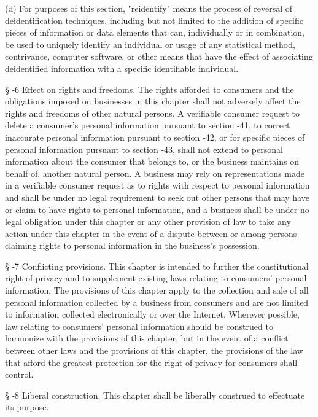      (d)  For purposes of this section, "reidentify" means the process of reversal of deidentification techniques, including but not limited to the addition of specific pieces of information or data elements that can, individually or in combination, be used to uniquely identify an individual or usage of any statistical method, contrivance, computer software, or other means that have the effect of associating deidentified information with a specific identifiable individual.

     §   -6  Effect on rights and freedoms.  The rights afforded to consumers and the obligations imposed on businesses in this chapter shall not adversely affect the rights and freedoms of other natural persons.  A verifiable consumer request to delete a consumer's personal information pursuant to section    -41, to correct inaccurate personal information pursuant to section    ‑42, or for specific pieces of personal information pursuant to section    ‑43, shall not extend to personal information about the consumer that belongs to, or the business maintains on behalf of, another natural person.  A business may rely on representations made in a verifiable consumer request as to rights with respect to personal information and shall be under no legal requirement to seek out other persons that may have or claim to have rights to personal information, and a business shall be under no legal obligation under this chapter or any other provision of law to take any action under this chapter in the event of a dispute between or among persons claiming rights to personal information in the business's possession.

     §   -7  Conflicting provisions.  This chapter is intended to further the constitutional right of privacy and to supplement existing laws relating to consumers' personal information.  The provisions of this chapter apply to the collection and sale of all personal information collected by a business from consumers and are not limited to information collected electronically or over the Internet.  Wherever possible, law relating to consumers' personal information should be construed to harmonize with the provisions of this chapter, but in the event of a conflict between other laws and the provisions of this chapter, the provisions of the law that afford the greatest protection for the right of privacy for consumers shall control.

     §   -8  Liberal construction.  This chapter shall be liberally construed to effectuate its purpose.

